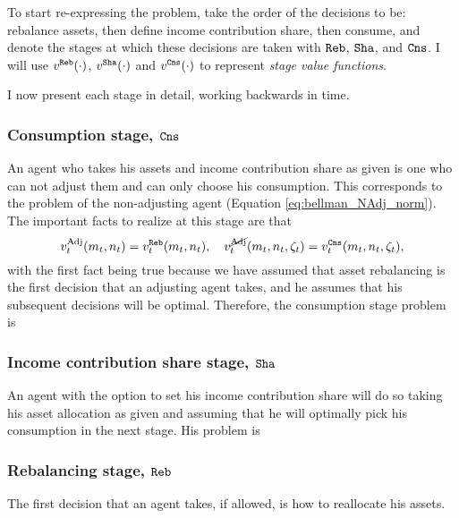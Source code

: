 \documentclass[./RiskyContrib.tex]{subfiles}
\begin{document}
To start re-expressing the problem, take the order of the decisions to be: rebalance
assets, then define income contribution share, then consume, and denote the stages
at which these decisions are taken with $\mathtt{Reb}$, $\mathtt{Sha}$, and $\mathtt{Cns}$. I will use
$v^{\mathtt{Reb}}(\cdot)$, $v^{\mathtt{Sha}}(\cdot)$ and $v^{\mathtt{Cns}}(\cdot)$ to represent
\emph{stage value functions}.

I now present each stage in detail, working backwards in time.

\subsubsection{Consumption stage, $\mathtt{Cns}$}

An agent who takes his assets and income contribution share as given is one who
can not adjust them and can only choose his consumption. This corresponds to the
problem of the non-adjusting agent (Equation \ref{eq:bellman_NAdj_norm}). The
important facts to realize at this stage are that
\begin{equation*}
v_t^{\text{Adj}}(m_t, n_t) = v_t^{\mathtt{Reb}}(m_t, n_t), \quad v_t^{\cancel{\text{Adj}}}(m_t, n_t, \zeta_t) = v_t^{\mathtt{Cns}}(m_t, n_t, \zeta_t),
\end{equation*}
with the first fact being true because we have assumed that asset rebalancing
is the first decision that an adjusting agent takes, and he assumes that his
subsequent decisions will be optimal. Therefore, the consumption stage problem is
\begin{equation*}

\end{equation*}

\subsubsection{Income contribution share stage, $\mathtt{Sha}$}

An agent with the option to set his income contribution share will do so
taking his asset allocation as given and assuming that he will optimally
pick his consumption in the next stage. His problem is
\begin{equation*}

\end{equation*}

\subsubsection{Rebalancing stage, $\mathtt{Reb}$}

The first decision that an agent takes, if allowed, is how to reallocate his
assets.
\begin{equation*}

\end{equation*}
\end{document}
